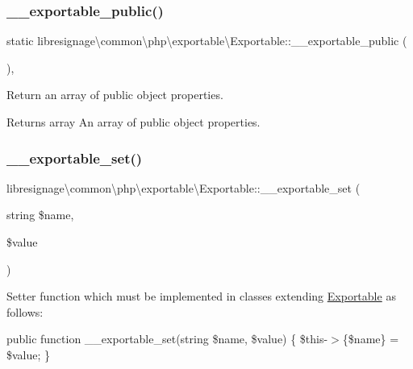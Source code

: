 \subsubsection{\texorpdfstring{\+\_\+\+\_\+exportable\+\_\+public()}{\_\_exportable\_public()}}
{\footnotesize\ttfamily static libresignage\textbackslash{}common\textbackslash{}php\textbackslash{}exportable\textbackslash{}\+Exportable\+::\+\_\+\+\_\+exportable\+\_\+public (\begin{DoxyParamCaption}{ }\end{DoxyParamCaption})\hspace{0.3cm}{\ttfamily [static]}, {\ttfamily [abstract]}}

Return an array of public object properties.

\begin{DoxyReturn}{Returns}
array An array of public object properties. 
\end{DoxyReturn}
\mbox{\label{classlibresignage_1_1common_1_1php_1_1exportable_1_1Exportable_ab3d5e9b1503d40a03f26ef2bbd874084}} 
\subsubsection{\texorpdfstring{\+\_\+\+\_\+exportable\+\_\+set()}{\_\_exportable\_set()}}
{\footnotesize\ttfamily libresignage\textbackslash{}common\textbackslash{}php\textbackslash{}exportable\textbackslash{}\+Exportable\+::\+\_\+\+\_\+exportable\+\_\+set (\begin{DoxyParamCaption}\item[{string}]{\$name,  }\item[{}]{\$value }\end{DoxyParamCaption})\hspace{0.3cm}{\ttfamily [abstract]}}

Setter function which must be implemented in classes extending \hyperlink{classlibresignage_1_1common_1_1php_1_1exportable_1_1Exportable}{Exportable} as follows\+:

public function \+\_\+\+\_\+exportable\+\_\+set(string \$name, \$value) \{ \$this-\/$>$\{\$name\} = \$value; \}


